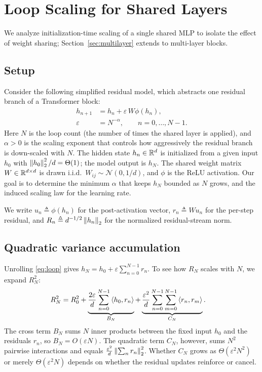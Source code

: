 \section{Loop Scaling for Shared Layers}
\label{sec:theory}

We analyze initialization-time scaling of a single shared MLP to isolate the effect of weight sharing; Section~\ref{sec:multilayer} extends to multi-layer blocks.

\subsection{Setup}

Consider the following simplified residual model, which abstracts one residual branch of a Transformer block:
\begin{equation}
  \begin{aligned}
  h_{n+1}&=h_n+\varepsilon\, W\phi(h_n),\\
  \varepsilon&=N^{-\alpha},\qquad n=0,\dots,N-1.
  \end{aligned}
  \label{eq:loop}
\end{equation}
Here $N$ is the loop count (the number of times the shared layer is applied), and $\alpha>0$ is the scaling exponent that controls how aggressively the residual branch is down-scaled with $N$.
The hidden state $h_n\in\mathbb{R}^d$ is initialized from a given input $h_0$ with $\left\lVert h_0 \right\rVert_2^2/d=\Theta(1)$; the model output is $h_N$.
The shared weight matrix $W\in\mathbb{R}^{d\times d}$ is drawn i.i.d.\ $W_{ij}\sim\mathcal N(0,1/d)$, and $\phi$ is the ReLU activation.
Our goal is to determine the minimum $\alpha$ that keeps $h_N$ bounded as $N$ grows, and the induced scaling law for the learning rate.

We write $u_n\triangleq\phi(h_n)$ for the post-activation vector, $r_n\triangleq Wu_n$ for the per-step residual, and $R_n\triangleq d^{-1/2}\left\lVert h_n \right\rVert_2$ for the normalized residual-stream norm.



\subsection{Quadratic variance accumulation}

Unrolling \eqref{eq:loop} gives $h_N=h_0+\varepsilon\sum_{n=0}^{N-1}r_n$.
To see how $R_N$ scales with $N$, we expand $R_N^2$:
\begin{equation*}
  \begin{aligned}
  R_N^2
  &=
  R_0^2
  +\underbrace{\frac{2\varepsilon}{d}
    \sum_{n=0}^{N-1}\left\langle h_0, r_n \right\rangle}_{B_N}
  +\underbrace{\frac{\varepsilon^2}{d}
    \sum_{n=0}^{N-1}\sum_{m=0}^{N-1}
    \left\langle r_n, r_m \right\rangle}_{C_N}.
  \end{aligned}
\end{equation*}
The cross term $B_N$ sums $N$ inner products between the fixed input $h_0$ and the residuals $r_n$, so $B_N=O(\varepsilon N)$.
The quadratic term $C_N$, however, sums $N^2$ pairwise interactions and equals $\frac{\varepsilon^2}{d}\left\lVert \sum_n r_n \right\rVert_2^2$.
Whether $C_N$ grows as $\Theta(\varepsilon^2 N^2)$ or merely $\Theta(\varepsilon^2 N)$ depends on whether the residual updates reinforce or cancel.

